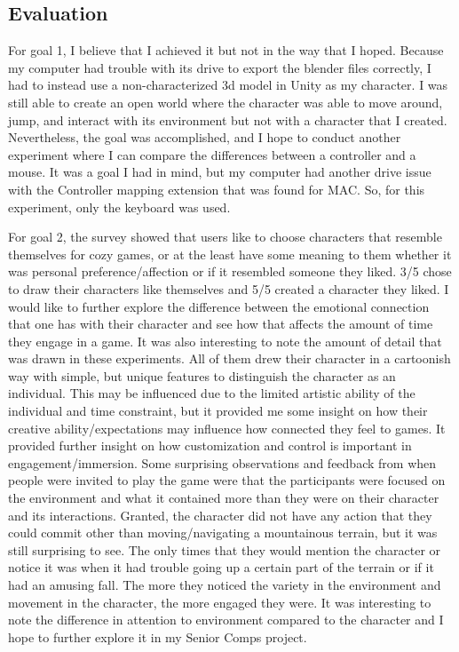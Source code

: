 \documentclass[10pt,twocolumn]{article}
\begin{document}
\subsection{Evaluation}
For goal 1, I believe that I achieved it but not in the way that I hoped. Because my computer had trouble with its drive to export the blender files correctly, I had to instead use a non-characterized 3d model in Unity as my character. I was still able to create an open world where the character was able to move around, jump, and interact with its environment but not with a character that I created. Nevertheless, the goal was accomplished, and I hope to conduct another experiment where I can compare the differences between a controller and a mouse. It was a goal I had in mind, but my computer had another drive issue with the Controller mapping extension that was found for MAC. So, for this experiment, only the keyboard was used.

For goal 2, the survey showed that users like to choose characters that resemble themselves for cozy games, or at the least have some meaning to them whether it was personal preference/affection or if it resembled someone they liked. 3/5 chose to draw their characters like themselves and 5/5 created a character they liked. I would like to further explore the difference between the emotional connection that one has with their character and see how that affects the amount of time they engage in a game. It was also interesting to note the amount of detail that was drawn in these experiments. All of them drew their character in a cartoonish way with simple, but unique features to distinguish the character as an individual. This may be influenced due to the limited artistic ability of the individual and time constraint, but it provided me some insight on how their creative ability/expectations may influence how connected they feel to games. It provided further insight on how customization and control is important in engagement/immersion. Some surprising observations and feedback from when people were invited to play the game were that the participants were focused on the environment and what it contained more than they were on their character and its interactions. Granted, the character did not have any action that they could commit other than moving/navigating a mountainous terrain, but it was still surprising to see. The only times that they would mention the character or notice it was when it had trouble going up a certain part of the terrain or if it had an amusing fall. The more they noticed the variety in the environment and movement in the character, the more engaged they were. It was interesting to note the difference in attention to environment compared to the character and I hope to further explore it in my Senior Comps project.
\end{document}
